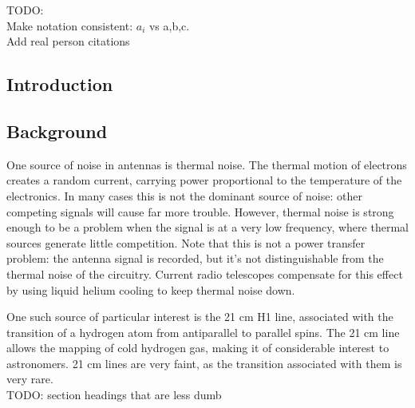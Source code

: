 \documentclass[final]{article}
\begin{document}
TODO:\\
Make notation consistent: \(a_i\) vs a,b,c.\\
Add real person citations

\subsection*{Introduction}
\subsection*{Background}
One source of noise in antennas is thermal noise.
The thermal motion of electrons creates a random current, carrying power proportional to the temperature of the electronics.
In many cases this is not the dominant source of noise: other competing signals will cause far more trouble.
However, thermal noise is strong enough to be a problem when the signal is at a very low frequency, where thermal sources generate little competition.
Note that this is not a power transfer problem: the antenna signal is recorded, but it's not distinguishable from the thermal noise of the circuitry.
Current radio telescopes compensate for this effect by using liquid helium cooling to keep thermal noise down.

One such source of particular interest is the 21 cm H1 line, associated with the transition of a hydrogen atom from antiparallel to parallel spins.
The 21 cm line allows the mapping of cold hydrogen gas, making it of considerable interest to astronomers.
21 cm lines are very faint, as the transition associated with them is very rare.
\\TODO: section headings that are less dumb
\end{document}
